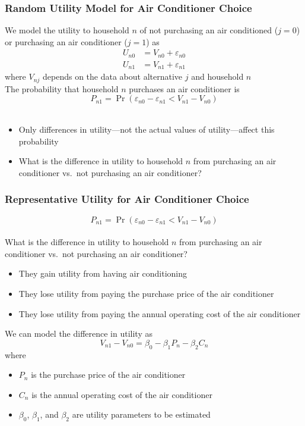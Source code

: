 \documentclass{beamer}\usepackage[]{graphicx}\usepackage[]{xcolor}
\begin{document}
\begin{frame}\frametitle{Random Utility Model for Air Conditioner Choice}
    We model the utility to household $n$ of not purchasing an air conditioned ($j = 0$) or purchasing an air conditioner ($j = 1$) as
    \begin{align*}
        U_{n0} & = V_{n0} + \varepsilon_{n0} \\
        U_{n1} & = V_{n1} + \varepsilon_{n1}
    \end{align*}
    where $V_{nj}$ depends on the data about alternative $j$ and household $n$ \\
    \vspace{3ex}
    The probability that household $n$ purchases an air conditioner is
    $$P_{n1} = \Pr(\varepsilon_{n0} - \varepsilon_{n1} < V_{n1} - V_{n0})$$ \\
    \begin{itemize}
        \item Only differences in utility---not the actual values of utility---affect this probability
        \item What is the difference in utility to household $n$ from purchasing an air conditioner vs.\ not purchasing an air conditioner?
    \end{itemize}
\end{frame}

\begin{frame}\frametitle{Representative Utility for Air Conditioner Choice}
    \vspace{-2ex}
    $$P_{n1} = \Pr(\varepsilon_{n0} - \varepsilon_{n1} < V_{n1} - V_{n0})$$ \\
    \vspace{1ex}
    What is the difference in utility to household $n$ from purchasing an air conditioner vs.\ not purchasing an air conditioner?
    \begin{itemize}
        \item They gain utility from having air conditioning
        \item They lose utility from paying the purchase price of the air conditioner
        \item They lose utility from paying the annual operating cost of the air conditioner
    \end{itemize}
    \vspace{2ex}
    We can model the difference in utility as
    $$V_{n1} - V_{n0} = \beta_0 - \beta_1 P_n - \beta_2 C_n$$
    where
    \begin{itemize}
        \item $P_n$ is the purchase price of the air conditioner
        \item $C_n$ is the annual operating cost of the air conditioner
        \item $\beta_0$, $\beta_1$, and $\beta_2$ are utility parameters to be estimated
    \end{itemize}
\end{frame}
\end{document}
